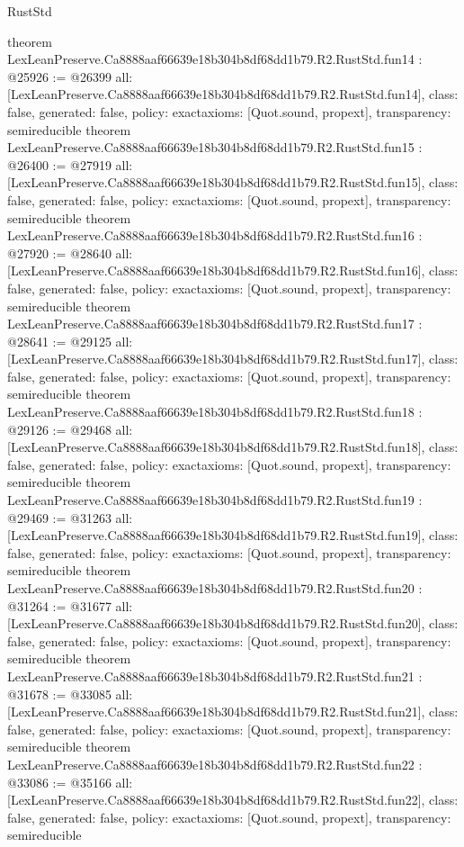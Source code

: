 \begin{lexlean}{RustStd}
\begin{coremodule}
{}
theorem LexLeanPreserve.Ca8888aaf66639e18b304b8df68dd1b79.R2.RustStd.fun14 : @25926 := @26399 {
  all: [LexLeanPreserve.Ca8888aaf66639e18b304b8df68dd1b79.R2.RustStd.fun14],
  class: false,
  generated: false,
  policy: exact{axioms: [Quot.sound, propext]},
  transparency: semireducible
}
theorem LexLeanPreserve.Ca8888aaf66639e18b304b8df68dd1b79.R2.RustStd.fun15 : @26400 := @27919 {
  all: [LexLeanPreserve.Ca8888aaf66639e18b304b8df68dd1b79.R2.RustStd.fun15],
  class: false,
  generated: false,
  policy: exact{axioms: [Quot.sound, propext]},
  transparency: semireducible
}
theorem LexLeanPreserve.Ca8888aaf66639e18b304b8df68dd1b79.R2.RustStd.fun16 : @27920 := @28640 {
  all: [LexLeanPreserve.Ca8888aaf66639e18b304b8df68dd1b79.R2.RustStd.fun16],
  class: false,
  generated: false,
  policy: exact{axioms: [Quot.sound, propext]},
  transparency: semireducible
}
theorem LexLeanPreserve.Ca8888aaf66639e18b304b8df68dd1b79.R2.RustStd.fun17 : @28641 := @29125 {
  all: [LexLeanPreserve.Ca8888aaf66639e18b304b8df68dd1b79.R2.RustStd.fun17],
  class: false,
  generated: false,
  policy: exact{axioms: [Quot.sound, propext]},
  transparency: semireducible
}
theorem LexLeanPreserve.Ca8888aaf66639e18b304b8df68dd1b79.R2.RustStd.fun18 : @29126 := @29468 {
  all: [LexLeanPreserve.Ca8888aaf66639e18b304b8df68dd1b79.R2.RustStd.fun18],
  class: false,
  generated: false,
  policy: exact{axioms: [Quot.sound, propext]},
  transparency: semireducible
}
theorem LexLeanPreserve.Ca8888aaf66639e18b304b8df68dd1b79.R2.RustStd.fun19 : @29469 := @31263 {
  all: [LexLeanPreserve.Ca8888aaf66639e18b304b8df68dd1b79.R2.RustStd.fun19],
  class: false,
  generated: false,
  policy: exact{axioms: [Quot.sound, propext]},
  transparency: semireducible
}
theorem LexLeanPreserve.Ca8888aaf66639e18b304b8df68dd1b79.R2.RustStd.fun20 : @31264 := @31677 {
  all: [LexLeanPreserve.Ca8888aaf66639e18b304b8df68dd1b79.R2.RustStd.fun20],
  class: false,
  generated: false,
  policy: exact{axioms: [Quot.sound, propext]},
  transparency: semireducible
}
theorem LexLeanPreserve.Ca8888aaf66639e18b304b8df68dd1b79.R2.RustStd.fun21 : @31678 := @33085 {
  all: [LexLeanPreserve.Ca8888aaf66639e18b304b8df68dd1b79.R2.RustStd.fun21],
  class: false,
  generated: false,
  policy: exact{axioms: [Quot.sound, propext]},
  transparency: semireducible
}
theorem LexLeanPreserve.Ca8888aaf66639e18b304b8df68dd1b79.R2.RustStd.fun22 : @33086 := @35166 {
  all: [LexLeanPreserve.Ca8888aaf66639e18b304b8df68dd1b79.R2.RustStd.fun22],
  class: false,
  generated: false,
  policy: exact{axioms: [Quot.sound, propext]},
  transparency: semireducible
}
\end{coremodule}
\end{lexlean}

